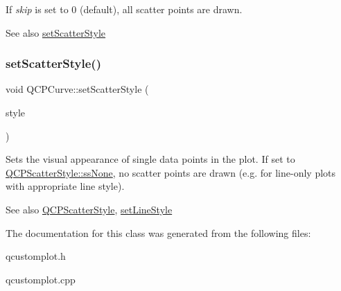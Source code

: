 If {\itshape skip} is set to 0 (default), all scatter points are drawn.

\begin{DoxySeeAlso}{See also}
\hyperlink{class_q_c_p_curve_a55e43b44709bf50a35500644988aa706}{set\+Scatter\+Style} 
\end{DoxySeeAlso}
\mbox{\label{class_q_c_p_curve_a55e43b44709bf50a35500644988aa706}} 
\subsubsection{\texorpdfstring{set\+Scatter\+Style()}{setScatterStyle()}}
{\footnotesize\ttfamily void Q\+C\+P\+Curve\+::set\+Scatter\+Style (\begin{DoxyParamCaption}\item[{const \hyperlink{class_q_c_p_scatter_style}{Q\+C\+P\+Scatter\+Style} \&}]{style }\end{DoxyParamCaption})}

Sets the visual appearance of single data points in the plot. If set to \hyperlink{class_q_c_p_scatter_style_adb31525af6b680e6f1b7472e43859349abd144c291ca274f77053ec68cab6c022}{Q\+C\+P\+Scatter\+Style\+::ss\+None}, no scatter points are drawn (e.\+g. for line-\/only plots with appropriate line style).

\begin{DoxySeeAlso}{See also}
\hyperlink{class_q_c_p_scatter_style}{Q\+C\+P\+Scatter\+Style}, \hyperlink{class_q_c_p_curve_a4a377ec863ff81a1875c3094a6177c19}{set\+Line\+Style} 
\end{DoxySeeAlso}


The documentation for this class was generated from the following files\+:\begin{DoxyCompactItemize}
\item 
qcustomplot.\+h\item 
qcustomplot.\+cpp\end{DoxyCompactItemize}
